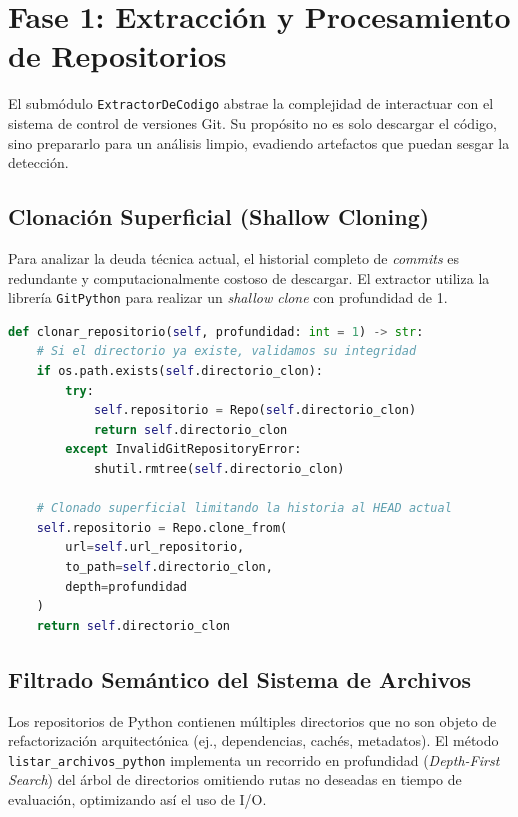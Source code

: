 \documentclass[12pt,a4paper]{article}
\begin{document}
\section{Fase 1: Extracción y Procesamiento de Repositorios}

El submódulo \texttt{ExtractorDeCodigo} abstrae la complejidad de interactuar con el sistema de control de versiones Git. Su propósito no es solo descargar el código, sino prepararlo para un análisis limpio, evadiendo artefactos que puedan sesgar la detección.

\subsection{Clonación Superficial (Shallow Cloning)}
Para analizar la deuda técnica actual, el historial completo de \textit{commits} es redundante y computacionalmente costoso de descargar. El extractor utiliza la librería \texttt{GitPython} para realizar un \textit{shallow clone} con profundidad de 1.

\begin{lstlisting}[language=Python, caption=Implementación de clonación superficial]
def clonar_repositorio(self, profundidad: int = 1) -> str:
    # Si el directorio ya existe, validamos su integridad
    if os.path.exists(self.directorio_clon):
        try:
            self.repositorio = Repo(self.directorio_clon)
            return self.directorio_clon
        except InvalidGitRepositoryError:
            shutil.rmtree(self.directorio_clon)

    # Clonado superficial limitando la historia al HEAD actual
    self.repositorio = Repo.clone_from(
        url=self.url_repositorio,
        to_path=self.directorio_clon,
        depth=profundidad 
    )
    return self.directorio_clon
\end{lstlisting}

\subsection{Filtrado Semántico del Sistema de Archivos}
Los repositorios de Python contienen múltiples directorios que no son objeto de refactorización arquitectónica (ej., dependencias, cachés, metadatos). El método \texttt{listar\_archivos\_python} implementa un recorrido en profundidad (\textit{Depth-First Search}) del árbol de directorios omitiendo rutas no deseadas en tiempo de evaluación, optimizando así el uso de I/O.
\end{document}
